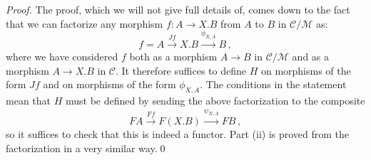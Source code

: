 \documentclass{svproc}
\newcommand\C{\mathcal{C}}
\newcommand\M{\mathcal{M}}
\newcommand*\from{\colon}
\newcommand{\0}{{\mathtt{0}}} \newcommand{\com}{{\mathtt{com}}}
\begin{document}
\begin{proof}
  The proof, which we will not give full details of, comes down to the fact that we can factorize any morphism $f\from A \to X.B$ from $A$ to $B$ in $\C/\M$ as:
  \[
    f = A \xrightarrow{Jf}
    X.B \xrightarrow{\phi_{X,A}}
    B\,,
    \]
  where we have considered $f$ both as a morphism $A\to B$ in $\C/\M$ and as a morphism $A \to X.B$ in $\C$.  
  It therefore suffices to define $H$ on morphisms of the form $Jf$ and on morphisms of the form $\phi_{X,A}$.  
  The conditions in the statement mean that $H$ must be defined by sending the above factorization to the composite
  \[
    FA \xrightarrow{Ff}
    F(X.B) \xrightarrow{\psi_{X,A}}
    FB\,,
    \]
  so it suffices to check that this is indeed a functor.
  Part (ii) is proved from the factorization in a very similar way.\qed
\end{proof}
\end{document}
